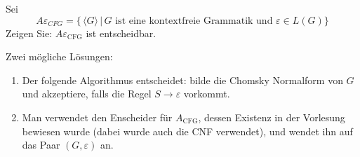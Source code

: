 Sei
\[
A\varepsilon_{CFG}=\{
\,\langle G\rangle\,|\,\text{$G$ ist eine kontextfreie Grammatik und $\varepsilon\in L(G)$}
\}
\]
Zeigen Sie: $A\varepsilon_{\text{CFG}}$ ist entscheidbar.

\begin{loesung}
Zwei mögliche Lösungen:
\begin{enumerate}
\item
Der folgende Algorithmus entscheidet: bilde die Chomsky Normalform von $G$
und akzeptiere, falls die Regel $S\to\varepsilon$ vorkommt.
\item
Man verwendet den Enscheider für $A_{\text{CFG}}$, dessen
Existenz in der Vorlesung bewiesen wurde (dabei wurde auch die CNF
verwendet), und wendet ihn auf das Paar $(G,\varepsilon)$ an.
\qedhere
\end{enumerate}
\end{loesung}
